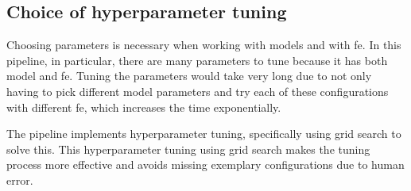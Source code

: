 \subsection{Choice of hyperparameter tuning}
Choosing parameters is necessary when working with models and with \gls{fe}. In this pipeline, in particular, there are many parameters to tune because it has both model and \gls{fe}. Tuning the parameters would take very long due to not only having to pick different model parameters and try each of these configurations with different \gls{fe}, which increases the time exponentially.

The pipeline implements hyperparameter tuning, specifically using grid search to solve this. This hyperparameter tuning using grid search makes the tuning process more effective and avoids missing exemplary configurations due to human error.